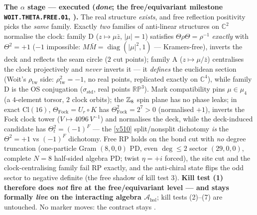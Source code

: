 \par\smallskip\noindent\textbf{The $\alpha$ stage --- executed (\emph{done}; the free/equivariant
milestone \texttt{WOIT.THETA.FREE.01}, ).} The real structure
\emph{exists}, and free reflection positivity picks the \emph{same} family. Exactly \emph{two}
families of anti-linear structures on $\mathbb C^2$ normalise the clock: family D
($z\mapsto\mu\bar z$, $|\mu|=1$) satisfies $\Theta\rho\Theta=\rho^{-1}$ \emph{exactly} with
$\Theta^2=+1$ ($-1$ impossible: $M\bar M=\operatorname{diag}(|\mu|^2,1)$ --- Kramers-free), inverts
the deck and reflects the seam circle ($2$ cut points); family A ($z\mapsto\mu/\bar z$) centralises
the clock projectively and \emph{never} inverts it --- it \emph{defines} the euclidean section
(Woit's $\rho_{\mathrm{tw}}$ side: $\rho_{\mathrm{tw}}^2=-1$, no real points, replicated exactly on
$\mathbb C^4$), while family D is the OS conjugation ($\sigma_{\mathrm{std}}$, real points
$\mathbb{RP}^3$). Mark compatibility pins $\mu\in\mu_4$ (a $4$-element torsor, $2$ clock orbits);
the $\mathbb Z_8$ spin plane has no phase leaks; in exact $\mathrm{Cl}(16)$,
$\Theta_{\mathrm{Fock}}=U_r\circ K$ has $\Theta_{\mathrm{Fock}}^2=2^7>0$ (normalised $+1$), inverts
the Fock clock tower ($V\mapsto 4096\,V^{-1}$) and normalises the deck, while the deck-induced
candidate has $\Theta_t^2=(-1)^F$ --- the \vref{v510} split/nonsplit dichotomy \emph{is} the
$\Theta^2=+1$ vs $(-1)^F$ dichotomy. Free RP holds on the bond cut with \emph{no} degree truncation
(one-particle Gram $(8,0,0)$ PD, even $\deg\le2$ sector $(29,0,0)$, complete $N=8$ half-sided
algebra PD; twist $\eta=+i$ forced), the site cut and the clock-centralising family fail RP
exactly, and the anti-chiral state flips the odd sector to negative definite (the free shadow of
kill test 3). \textbf{Kill test (1) therefore does \emph{not} fire at the free/equivariant level
--- and stays formally \emph{live} on the interacting algebra $\mathcal A_{\mathrm{hol}}$}; kill
tests (2)--(7) are untouched. No marker moves: the contract stays \mO.

